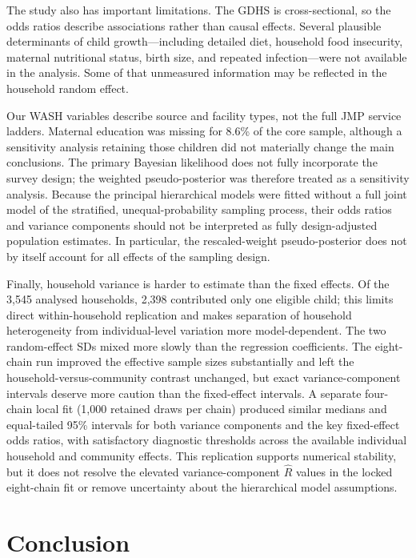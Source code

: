 \documentclass[11pt]{article}
\begin{document}
The study also has important limitations. The GDHS is cross-sectional, so the odds ratios describe associations rather than causal effects. Several plausible determinants of child growth---including detailed diet, household food insecurity, maternal nutritional status, birth size, and repeated infection---were not available in the analysis. Some of that unmeasured information may be reflected in the household random effect.

Our WASH variables describe source and facility types, not the full JMP service ladders. Maternal education was missing for 8.6\% of the core sample, although a sensitivity analysis retaining those children did not materially change the main conclusions. The primary Bayesian likelihood does not fully incorporate the survey design; the weighted pseudo-posterior was therefore treated as a sensitivity analysis. Because the principal hierarchical models were fitted without a full joint model of the stratified, unequal-probability sampling process, their odds ratios and variance components should not be interpreted as fully design-adjusted population estimates. In particular, the rescaled-weight pseudo-posterior does not by itself account for all effects of the sampling design.

Finally, household variance is harder to estimate than the fixed effects. Of the 3,545 analysed households, 2,398 contributed only one eligible child; this limits direct within-household replication and makes separation of household heterogeneity from individual-level variation more model-dependent. The two random-effect SDs mixed more slowly than the regression coefficients. The eight-chain run improved the effective sample sizes substantially and left the household-versus-community contrast unchanged, but exact variance-component intervals deserve more caution than the fixed-effect intervals. A separate four-chain local fit (1,000 retained draws per chain) produced similar medians and equal-tailed 95\% intervals for both variance components and the key fixed-effect odds ratios, with satisfactory diagnostic thresholds across the available individual household and community effects. This replication supports numerical stability, but it does not resolve the elevated variance-component $\hat R$ values in the locked eight-chain fit or remove uncertainty about the hierarchical model assumptions.

\section{Conclusion}
\end{document}
